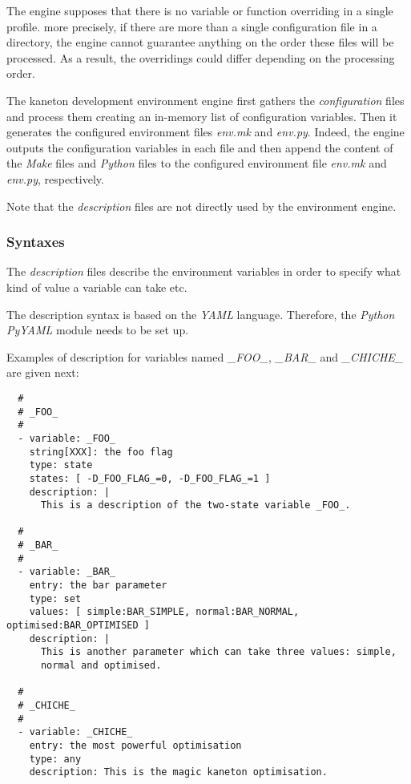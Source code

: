 The engine supposes that there is no variable or function overriding in
a single profile. more precisely, if there are more than a single
configuration file in a directory, the engine cannot guarantee anything
on the order these files will be processed. As a result, the overridings
could differ depending on the processing order.

The kaneton development environment engine first gathers the
\textit{configuration} files and process them creating an in-memory list of
configuration variables. Then it generates the configured environment files
\textit{env.mk} and \textit{env.py}. Indeed, the engine outputs the
configuration variables in each file and then append the content of the
\textit{Make} files and \textit{Python} files to the configured environment
file \textit{env.mk} and \textit{env.py}, respectively.

Note that the \textit{description} files are not directly used by the
environment engine.

%
%

\subsubsection{Syntaxes}



The \textit{description} files describe the environment variables in order
to specify what kind of value a variable can take etc.

The description syntax is based on the \textit{YAML} language. Therefore,
the \textit{Python} \textit{PyYAML} module needs to be set up.

Examples of description for variables named \textit{\_FOO\_}, \textit{\_BAR\_}
and \textit{\_CHICHE\_} are given next:

\begin{verbatim}
  #
  # _FOO_
  #
  - variable: _FOO_
    string[XXX]: the foo flag
    type: state
    states: [ -D_FOO_FLAG_=0, -D_FOO_FLAG_=1 ]
    description: |
      This is a description of the two-state variable _FOO_.

  #
  # _BAR_
  #
  - variable: _BAR_
    entry: the bar parameter
    type: set
    values: [ simple:BAR_SIMPLE, normal:BAR_NORMAL, optimised:BAR_OPTIMISED ]
    description: |
      This is another parameter which can take three values: simple,
      normal and optimised.

  #
  # _CHICHE_
  #
  - variable: _CHICHE_
    entry: the most powerful optimisation
    type: any
    description: This is the magic kaneton optimisation.
\end{verbatim}

